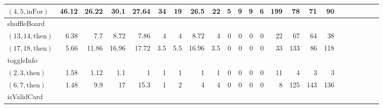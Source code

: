 \documentclass[sigconf]{acmart}
\newcommand{\thenBr}{\text{then}}
\newcommand{\inFor}{\text{inFor}}
\newcommand{\inWhile}{\text{inWhile}}
\begin{document}
\begin{table*}
{\begin{tabular}{l|rrrr|rrrr|rrrr|rrrr|r|r|r|r|r|r}
    $(4,5,\inFor)$    & 46.12       & 26.22       & 30.1           & 27.64         & 34    & 19    & 26.5    & 22      & 5        & 9        & 9          & 6           & 199      & 78      & 71         & 90 & & & & & & \\
    \midrule
    shuffleBoard      &             &             &                &               &       &       &         &         &          &          &            &             &          &         &            & & & & & & &\\
    $(13,14,\thenBr)$ & 6.38        & 7.7         & 8.72           & 7.86          & 4     & 4     & 8.72    & 4       & 0        & 0        & 0          & 0           & 22       & 67      & 64         & 38 & & & & & & \\
    $(17,18,\thenBr)$ & 5.66        & 11.86       & 16.96          & 17.72         & 3.5   & 5.5   & 16.96   & 3.5     & 0        & 0        & 0          & 0           & 33       & 133     & 86         & 118 & & & & & & \\
    \midrule
    \midrule
    toggleInfo        &             &             &                &               &       &       &         &         &          &          &            &             &          &         &            & \\
    $(2,3,\thenBr)$   & 1.58        & 1.12        & 1.1            & 1             & 1     & 1     & 1       & 1       & 0        & 0        & 0          & 0           & 11       & 4       & 3          & 3 & & & & & & \\
    $(6,7,\thenBr)$   & 1.48        & 9.9         & 17             & 15.3          & 1     & 2     & 4       & 4       & 0        & 0        & 0          & 0           & 8        & 125     & 143        & 136 & & & & & & \\
    \midrule
    \midrule
    isValidCard       &             &             &                &               &       &       &         &         &          &          &            &             &          &         &            & & & & & & & \\ 

\end{tabular}}
\end{table*}
\end{document}
